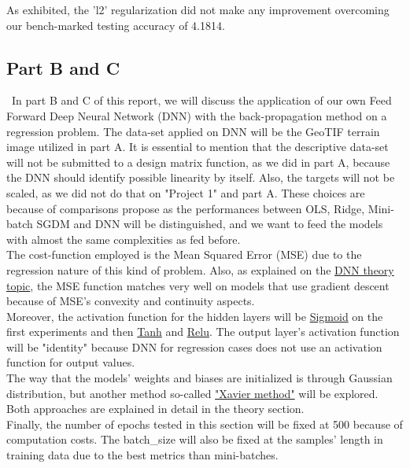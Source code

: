 As exhibited, the 'l2' regularization did not make any improvement overcoming our bench-marked testing accuracy of 4.1814.

\subsection{Part B and C}
\label{chap:Part B and C}

\quad \, In part B and C of this report, we will discuss the application of our own Feed Forward Deep Neural Network (DNN) with the back-propagation method on a regression problem. The data-set applied on DNN will be the GeoTIF terrain image utilized in part A. It is essential to mention that the descriptive data-set will not be submitted to a design matrix function, as we did in part A, because the DNN should identify possible linearity by itself. Also, the targets will not be scaled, as we did not do that on "Project 1" and part A. These choices are because of comparisons propose as the performances between OLS, Ridge, Mini-batch SGDM and DNN will be distinguished, and we want to feed the models with almost the same complexities as fed before.\\

The cost-function employed is the Mean Squared Error (MSE) due to the regression nature of this kind of problem. Also, as explained on the \hyperref[chap:Deep Neural Networks]{DNN theory topic}, the MSE function matches very well on models that use gradient descent because of MSE's convexity and continuity aspects.\\

Moreover, the activation function for the hidden layers will be \hyperref[chap:Sigmoid]{Sigmoid} on the first experiments and then \hyperref[chap:Hyperbolic tanh]{Tanh} and \hyperref[chap:Rectified Linear Unit]{Relu}. The output layer's activation function will be "identity" because DNN for regression cases does not use an activation function for output values.\\

The way that the models' weights and biases are initialized is through Gaussian distribution, but another method so-called \hyperref[chap:Xavier and He weights initialization method]{"Xavier method"} will be explored. Both approaches are explained in detail in the theory section.\\

Finally, the number of epochs tested in this section will be fixed at 500 because of computation costs. The batch\_size will also be fixed at the samples' length in training data due to the best metrics than mini-batches.

